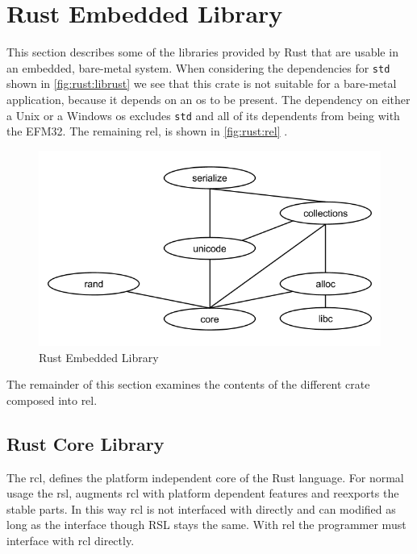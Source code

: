 \section{Rust Embedded Library}

This section describes some of the libraries provided by Rust that are usable in an embedded, bare-metal system.
When considering the dependencies for \texttt{std} shown in \autoref{fig:rust:librust} we see that this crate is not suitable for a bare-metal application, because it depends on an \gls{os} to be present.
The dependency on either a Unix or a Windows \gls{os} excludes \texttt{std} and all of its dependents from being with the EFM32.
The remaining \gls{rel}, is shown in \autoref{fig:rust:rel} .


\begin{figure}[H]
  \begin{center}
    \includegraphics[scale=0.3]{figures/background/rust/embedded-rust-lib.png}
  \end{center}
  \caption{Rust Embedded Library}
  \label{fig:rust:rel}
\end{figure}

The remainder of this section examines the contents of the different crate composed into \gls{rel}.

\subsection{Rust Core Library}


The \gls{rcl}, defines the platform independent core of the Rust language.
For normal usage the \gls{rsl}, augments \gls{rcl} with platform dependent features and reexports the stable parts.
In this way \gls{rcl} is not interfaced with directly and can modified as long as the interface though RSL stays the same.
With \gls{rel} the programmer must interface with \gls{rcl} directly.

